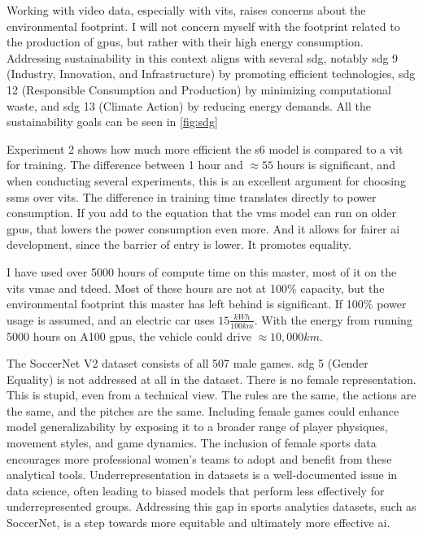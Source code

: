 Working with video data, especially with \acrshort{vit}s, raises concerns about the environmental footprint. I will not concern myself with the footprint related to the production of \acrshort{gpu}s, but rather with their high energy consumption. Addressing sustainability in this context aligns with several \acrfull{sdg}, notably \acrshort{sdg} 9 (Industry, Innovation, and Infrastructure) by promoting efficient technologies, \acrshort{sdg} 12 (Responsible Consumption and Production) by minimizing computational waste, and \acrshort{sdg} 13 (Climate Action) by reducing energy demands. All the sustainability goals can be seen in \cref{fig:sdg}

Experiment 2 shows how much more efficient the \acrshort{s6} model is compared to a \acrshort{vit} for training. The difference between 1 hour and $\approx55$ hours is significant, and when conducting several experiments, this is an excellent argument for choosing \acrshort{ssm}s over \acrshort{vit}s. The difference in training time translates directly to power consumption. If you add to the equation that the \acrshort{vms} model can run on older \acrshort{gpu}s, that lowers the power consumption even more. And it allows for fairer \acrfull{ai} development, since the barrier of entry is lower. It promotes equality. 

I have used over 5000 hours of compute time on this master, most of it on the \acrlong{vit}s \acrshort{vmae} and \acrshort{tdeed}. Most of these hours are not at 100$\%$ capacity, but the environmental footprint this master has left behind is significant. If 100$\%$ power usage is assumed, and an electric car uses $15\frac{kWh}{100km}$. With the energy from running 5000 hours on A100 \acrshort{gpu}s, the vehicle could drive $\approx10,000 km$. 

The SoccerNet V2 dataset consists of all 507 male games. \acrshort{sdg} 5 (Gender Equality) is not addressed at all in the dataset. There is no female representation. This is stupid, even from a technical view. The rules are the same, the actions are the same, and the pitches are the same. Including female games could enhance model generalizability by exposing it to a broader range of player physiques, movement styles, and game dynamics. The inclusion of female sports data encourages more professional women's teams to adopt and benefit from these analytical tools. Underrepresentation in datasets is a well-documented issue in data science, often leading to biased models that perform less effectively for underrepresented groups. Addressing this gap in sports analytics datasets, such as SoccerNet, is a step towards more equitable and ultimately more effective \acrshort{ai}.